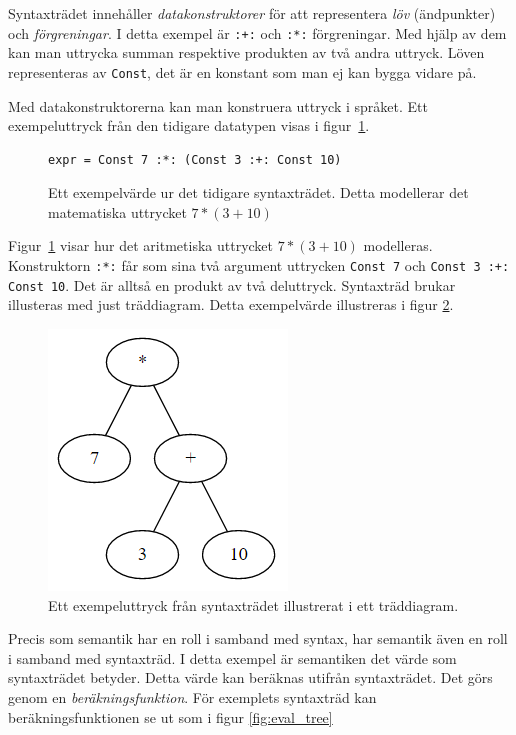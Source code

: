 \begin{draft}
Syntaxträdet innehåller \textit{datakonstruktorer} för att representera
\textit{löv} (ändpunkter) och \textit{förgreningar}. I detta exempel är
\texttt{:+:} och \texttt{:*:} förgreningar. Med hjälp av dem kan man uttrycka
summan respektive produkten av två andra uttryck. Löven representeras av
\texttt{Const}, det är en konstant som man ej kan bygga vidare på.

Med datakonstruktorerna kan man konstruera uttryck i språket. Ett exempeluttryck
från den tidigare datatypen visas i figur~\ref{fig:syntax_exempel_varde}.

\begin{figure}[tph]
  \begin{lstlisting}
expr = Const 7 :*: (Const 3 :+: Const 10)
  \end{lstlisting}
  \caption{Ett exempelvärde ur det tidigare syntaxträdet. Detta modellerar det
           matematiska uttrycket $7 * (3 + 10)$}\label{fig:syntax_exempel_varde}
\end{figure}

Figur~\ref{fig:syntax_exempel_varde} visar hur det aritmetiska uttrycket $7 * (3
+ 10)$ modelleras. Konstruktorn \texttt{:*:} får som sina två argument uttrycken
\texttt{Const 7} och \texttt{Const 3 :+: Const 10}. Det är alltså en produkt av
två deluttryck. Syntaxträd brukar illusteras med just träddiagram. Detta
exempelvärde illustreras i figur \ref{fig:syntax_exempel_bild}.

\begin{figure}[tph]
  \centering
  \includegraphics[width=0.4\linewidth]{figure/syntax_exempel_bild.png}
  \caption{Ett exempeluttryck från syntaxträdet illustrerat i ett
           träddiagram.}\label{fig:syntax_exempel_bild} 
\end{figure}

Precis som semantik har en roll i samband med syntax, har semantik även en roll
i samband med syntaxträd. I detta exempel är semantiken det värde som
syntaxträdet betyder. Detta värde kan beräknas utifrån syntaxträdet. Det görs
genom en \textit{beräkningsfunktion}. För exemplets syntaxträd kan
beräkningsfunktionen se ut som i figur \ref{fig:eval_tree}


\end{draft}
